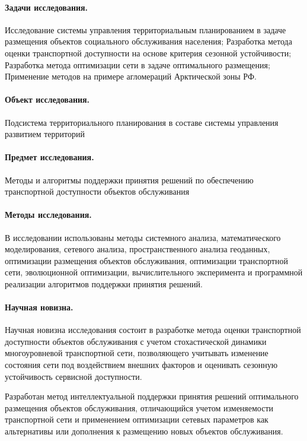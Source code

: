 \paragraph*{Задачи исследования.}
Исследование системы управления территориальным планированием в задаче размещения объектов социального обслуживания населения;
Разработка метода оценки транспортной доступности на основе критерия сезонной устойчивости;
Разработка метода оптимизации сети в задаче оптимального размещения;
Применение методов на примере агломераций Арктической зоны РФ.

\paragraph*{Объект исследования.}
Подсистема территориального планирования в составе системы управления развитием территорий

\paragraph*{Предмет исследования.}
Методы и алгоритмы поддержки принятия решений по обеспечению транспортной доступности объектов обслуживания

\paragraph*{Методы исследования.}
В исследовании использованы методы системного анализа, математического моделирования, сетевого анализа, пространственного анализа геоданных, оптимизации размещения объектов обслуживания, оптимизации транспортной сети, эволюционной оптимизации, вычислительного эксперимента и программной реализации алгоритмов поддержки принятия решений.

\paragraph*{Научная новизна.}
Научная новизна исследования состоит в разработке метода оценки транспортной доступности объектов обслуживания с учетом стохастической динамики многоуровневой транспортной сети, позволяющего учитывать изменение состояния сети под воздействием внешних факторов и оценивать сезонную устойчивость сервисной доступности.

Разработан метод интеллектуальной поддержки принятия решений оптимального размещения объектов обслуживания, отличающийся учетом изменяемости транспортной сети и применением оптимизации сетевых параметров как альтернативы или дополнения к размещению новых объектов обслуживания.

